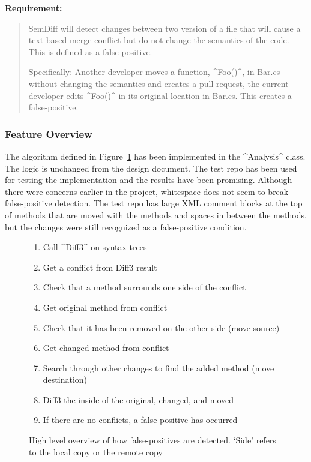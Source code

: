 \documentclass[draftclsnofoot,onecolumn]{IEEEtran}
\begin{document}
\textbf{Requirement:}

\begin{quote}

SemDiff will detect changes between two version of a file that will cause a text-based merge conflict but do not change the semantics of the code. This is defined as a false-positive. 

Specifically: Another developer moves a function, ^Foo()^, in Bar.cs without changing the semantics and creates a pull request, the current developer edits ^Foo()^ in its original location in Bar.cs. This creates a false-positive.

\end{quote}

\subsubsection{Feature Overview}

The algorithm defined in Figure~\ref{fpalgore} has been implemented in the ^Analysis^ class. The logic is unchanged from the design document. The test repo has been used for testing the implementation and the results have been promising. Although there were concerns earlier in the project, whitespace 
does not seem to break false-positive detection. The test repo has large XML comment blocks at the top of methods that are moved with the methods and spaces in between the methods, but the changes were still recognized as a false-positive condition.


\begin{figure}[ht]
\centering
\begin{enumerate}
    \item Call ^Diff3^ on syntax trees
    \item Get a conflict from Diff3 result
    \item Check that a method surrounds one side of the conflict
    \item Get original method from conflict
    \item Check that it has been removed on the other side (move source)
    \item Get changed method from conflict
    \item Search through other changes to find the added method (move 
destination)
    \item Diff3 the inside of the original, changed, and moved
    \item If there are no conflicts, a false-positive has occurred
\end{enumerate}
\caption{High level overview of how false-positives are detected. `Side' 
refers to the local copy or the remote copy}
\label{fpalgore}
\end{figure}
\end{document}
